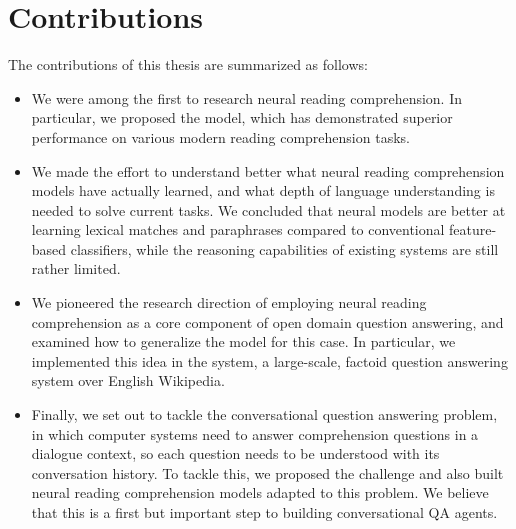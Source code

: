 \section{Contributions}
The contributions of this thesis are summarized as follows:
\begin{itemize}
    \item
        We were among the first to research neural reading comprehension. In particular, we proposed the  model, which has demonstrated superior performance on various modern reading comprehension tasks.
    \item
        We made the effort to understand better what neural reading comprehension models have actually learned, and what depth of language understanding is needed to solve current tasks. We concluded that neural models are better at learning lexical matches and paraphrases compared to conventional feature-based classifiers, while the reasoning capabilities of existing systems are still rather limited.
    \item
        We pioneered the research direction of employing neural reading comprehension as a core component of open domain question answering, and examined how to generalize the model for this case. In particular, we implemented this idea in the  system, a large-scale, factoid question answering system over English Wikipedia.
    \item
        Finally, we set out to tackle the conversational question answering problem, in which computer systems need to answer comprehension questions in a dialogue context, so each question needs to be understood with its conversation history. To tackle this, we proposed the  challenge and also built neural reading comprehension models adapted to this problem. We believe that this is a first but important step to building conversational QA agents.
\end{itemize}
